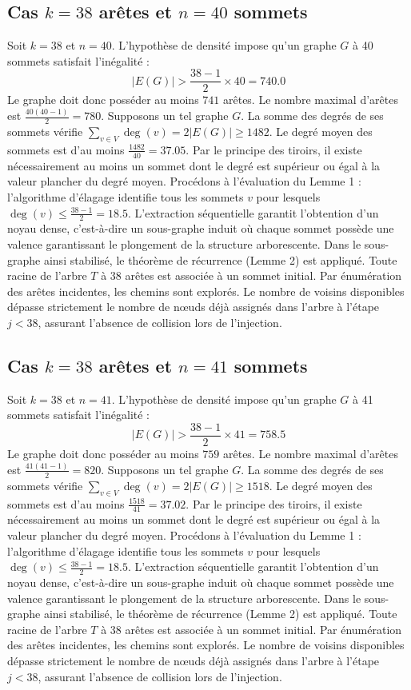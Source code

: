 \documentclass[12pt,a4paper]{article}
\begin{document}
\subsection{Cas $k = 38$ arêtes et $n = 40$ sommets}
Soit $k = 38$ et $n = 40$. L'hypothèse de densité impose qu'un graphe $G$ à 40 sommets satisfait l'inégalité :
$$ |E(G)| > \frac{38-1}{2} \times 40 = 740.0 $$
Le graphe doit donc posséder au moins $741$ arêtes. Le nombre maximal d'arêtes est $\frac{40(40-1)}{2} = 780$.
Supposons un tel graphe $G$. La somme des degrés de ses sommets vérifie $\sum_{v \in V} \deg(v) = 2|E(G)| \geq 1482$.
Le degré moyen des sommets est d'au moins $\frac{1482}{40} = 37.05$.
Par le principe des tiroirs, il existe nécessairement au moins un sommet dont le degré est supérieur ou égal à la valeur plancher du degré moyen.
Procédons à l'évaluation du Lemme 1 : l'algorithme d'élagage identifie tous les sommets $v$ pour lesquels $\deg(v) \leq \frac{38-1}{2} = 18.5$.
L'extraction séquentielle garantit l'obtention d'un noyau dense, c'est-à-dire un sous-graphe induit où chaque sommet possède une valence garantissant le plongement de la structure arborescente.
Dans le sous-graphe ainsi stabilisé, le théorème de récurrence (Lemme 2) est appliqué. Toute racine de l'arbre $T$ à 38 arêtes est associée à un sommet initial. Par énumération des arêtes incidentes, les chemins sont explorés. Le nombre de voisins disponibles dépasse strictement le nombre de nœuds déjà assignés dans l'arbre à l'étape $j < 38$, assurant l'absence de collision lors de l'injection.

\subsection{Cas $k = 38$ arêtes et $n = 41$ sommets}
Soit $k = 38$ et $n = 41$. L'hypothèse de densité impose qu'un graphe $G$ à 41 sommets satisfait l'inégalité :
$$ |E(G)| > \frac{38-1}{2} \times 41 = 758.5 $$
Le graphe doit donc posséder au moins $759$ arêtes. Le nombre maximal d'arêtes est $\frac{41(41-1)}{2} = 820$.
Supposons un tel graphe $G$. La somme des degrés de ses sommets vérifie $\sum_{v \in V} \deg(v) = 2|E(G)| \geq 1518$.
Le degré moyen des sommets est d'au moins $\frac{1518}{41} = 37.02$.
Par le principe des tiroirs, il existe nécessairement au moins un sommet dont le degré est supérieur ou égal à la valeur plancher du degré moyen.
Procédons à l'évaluation du Lemme 1 : l'algorithme d'élagage identifie tous les sommets $v$ pour lesquels $\deg(v) \leq \frac{38-1}{2} = 18.5$.
L'extraction séquentielle garantit l'obtention d'un noyau dense, c'est-à-dire un sous-graphe induit où chaque sommet possède une valence garantissant le plongement de la structure arborescente.
Dans le sous-graphe ainsi stabilisé, le théorème de récurrence (Lemme 2) est appliqué. Toute racine de l'arbre $T$ à 38 arêtes est associée à un sommet initial. Par énumération des arêtes incidentes, les chemins sont explorés. Le nombre de voisins disponibles dépasse strictement le nombre de nœuds déjà assignés dans l'arbre à l'étape $j < 38$, assurant l'absence de collision lors de l'injection.
\end{document}
